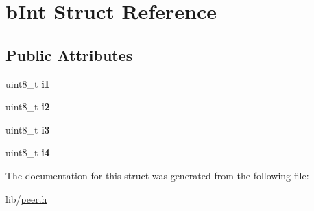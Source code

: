 \hypertarget{structbInt}{}\section{b\+Int Struct Reference}
\label{structbInt}
\subsection*{Public Attributes}
\begin{DoxyCompactItemize}
\item 
\mbox{\label{structbInt_a2f9e3b9f6687d378cdab799d5eb5205c}} 
uint8\+\_\+t {\bfseries i1}
\item 
\mbox{\label{structbInt_aab28c4437083187b2374ba69e2353ece}} 
uint8\+\_\+t {\bfseries i2}
\item 
\mbox{\label{structbInt_a3a44f29a66a9a97ac6b79d6fa53664ba}} 
uint8\+\_\+t {\bfseries i3}
\item 
\mbox{\label{structbInt_afeeae065a1c51d70a1e8e34bdd4eba02}} 
uint8\+\_\+t {\bfseries i4}
\end{DoxyCompactItemize}


The documentation for this struct was generated from the following file\+:\begin{DoxyCompactItemize}
\item 
lib/\hyperlink{peer_8h}{peer.\+h}\end{DoxyCompactItemize}
